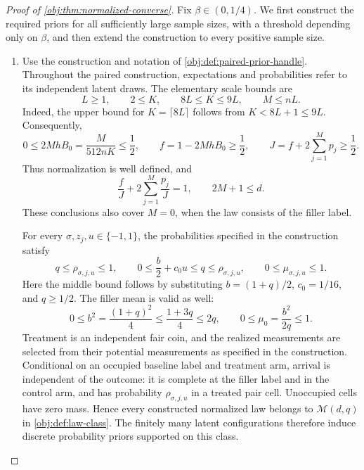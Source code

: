 \documentclass[11pt]{article}
\begin{document}
\begin{proof}[Proof of \cref{obj:thm:normalized-converse}]
Fix \(\beta\in(0,1/4)\). We first construct the required priors for all sufficiently large sample sizes, with a threshold depending only on \(\beta\), and then extend the construction to every positive sample size.

\begin{enumerate}
\item
Use the construction and notation of
\cref{obj:def:paired-prior-handle}. Throughout the paired construction, expectations and probabilities refer to its independent latent draws. The elementary scale bounds are
\[
L\ge1,\qquad 2\le K,\qquad 8L\le K\le9L,\qquad M\le nL.
\]
Indeed, the upper bound for \(K=\lceil8L\rceil\) follows from
\(K<8L+1\le9L\). Consequently,
\[
0\le 2MhB_0=\frac{M}{512nK}\le\frac12,
\qquad
f=1-2MhB_0\ge\frac12,
\qquad
J=f+2\sum_{j=1}^{M}p_j\ge\frac12.
\]
Thus normalization is well defined, and
\[
\frac fJ+2\sum_{j=1}^{M}\frac{p_j}{J}=1,
\qquad
2M+1\le d.
\]
These conclusions also cover \(M=0\), when the law consists of the filler label.

For every \(\sigma,z_j,u\in\{-1,1\}\), the probabilities specified in the construction satisfy
\[
q\le \rho_{\sigma,j,u}\le1,
\qquad
0\le \frac b2+c_0u\le q\le\rho_{\sigma,j,u},
\qquad
0\le\mu_{\sigma,j,u}\le1.
\]
Here the middle bound follows by substituting
\(b=(1+q)/2\), \(c_0=1/16\), and \(q\ge1/2\).
The filler mean is valid as well:
\[
0\le b^2=\frac{(1+q)^2}{4}
\le\frac{1+3q}{4}\le2q,
\qquad
0\le\mu_0=\frac{b^2}{2q}\le1.
\]
Treatment is an independent fair coin, and the realized measurements are selected from their potential measurements as specified in the construction. Conditional on an occupied baseline label and treatment arm, arrival is independent of the outcome: it is complete at the filler label and in the control arm, and has probability \(\rho_{\sigma,j,u}\) in a treated pair cell. Unoccupied cells have zero mass. Hence every constructed normalized law belongs to
\(\mathcal M(d,q)\) in \cref{obj:def:law-class}. The finitely many latent configurations therefore induce discrete probability priors supported on this class.


\end{enumerate}
\end{proof}
\end{document}
